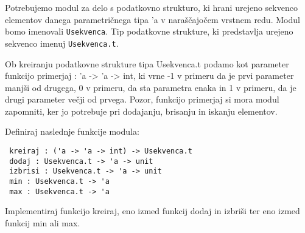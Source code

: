 \begin{ex}
Potrebujemo modul za delo s podatkovno strukturo, ki hrani urejeno sekvenco elementov danega parametri\v cnega tipa 'a v nara\v s\v cajo\v cem vrstnem redu. Modul bomo imenovali \lstinline{Usekvenca}. Tip podatkovne strukture, ki predstavlja urejeno sekvenco imenuj \lstinline{Usekvenca.t}.

Ob kreiranju podatkovne strukture tipa Usekvenca.t podamo kot parameter funkcijo primerjaj : 'a -> 'a -> int, ki vrne -1 v primeru da je prvi parameter manj\v si od drugega, 0 v primeru, da sta parametra enaka in 1 v primeru, da je drugi parameter ve\v cji od prvega. Pozor, funkcijo primerjaj si mora modul zapomniti, ker jo potrebuje pri
dodajanju, brisanju in iskanju elementov.

Definiraj naslednje funkcije modula: 
\begin{lstlisting}
 kreiraj : ('a -> 'a -> int) -> Usekvenca.t 
 dodaj : Usekvenca.t -> 'a -> unit 
 izbrisi : Usekvenca.t -> 'a -> unit   
 min : Usekvenca.t -> 'a 
 max : Usekvenca.t -> 'a 
\end{lstlisting}

Implementiraj funkcijo kreiraj, eno izmed funkcij dodaj in izbri\v si ter
eno izmed funkcij min ali max.
\end{ex}



